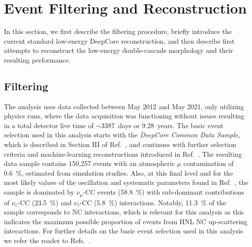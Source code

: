 \documentclass[
    aps,
    prd,
    reprint,
    amsmath,
    amssymb,
    nofootinbib,
    superscriptaddress,
    floatfix
]{revtex4-2}
\def\nomathut4{|U_{\tau4}|^2}
\begin{document}
\section{\label{sec:filter_and_reco}Event Filtering and Reconstruction}

In this section, we first describe the filtering procedure, briefly introduce the current standard low-energy DeepCore reconstruction, and then describe first attempts to reconstruct the low-energy double-cascade morphology and their resulting performance.


\subsection{\label{sec:filter}Filtering}

The analysis uses data collected between May 2012 and May 2021, only utilizing physics runs, where the data acquisition was functioning without issues resulting in a total detector live time of $\sim$\SI{3387}{days} or \SI{9.28}{years}. The basic event selection used in this analysis starts with the \textit{DeepCore Common Data Sample}, which is described in Section III of Ref.~\cite{IceCubeCollaboration:2023wtb}, and continues with further selection criteria and machine-learning reconstructions introduced in Ref.~\cite{IceCube:2024xjj}.
The resulting data sample contains 150,257 events with an atmospheric $\mu$ contamination of \SI{0.6}{\percent}, estimated from simulation studies.
Also, at this final level and for the most likely values of the oscillation and systematic parameters found in Ref.~\cite{IceCube:2024xjj}, the sample is dominated by $\nu_\mu$-CC events (\SI{58.8}{\percent}) with sub-dominant contributions of $\nu_e$-CC (\SI{23.5}{\percent}) and $\nu_\tau$-CC (\SI{5.8}{\percent}) interactions.
Notably, \SI{11.3}{\percent} of the sample corresponds to NC interactions, which is relevant for this analysis as this indicates the maximum possible proportion of events from HNL NC up-scattering interactions.
For further details on the basic event selection used in this analysis we refer the reader to Refs.~\cite{IceCubeCollaboration:2023wtb,IceCube:2024xjj}.

\end{document}
